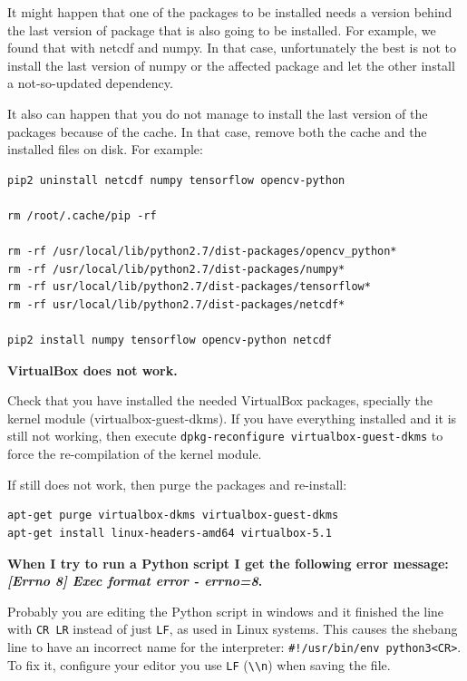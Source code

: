 \documentclass[a4paper,12pt]{article}
\begin{document}
It might happen that one of the packages to be installed needs a version behind the last version of package that is also going to be installed. For example, we found that with netcdf and numpy. In that case, unfortunately the best is not to install the last version of numpy or the affected package and let the other install a not-so-updated dependency.

It also can happen that you do not manage to install the last version of the packages because of the cache. In that case, remove both the cache and the installed files on disk. For example:

\begin{verbatim}
pip2 uninstall netcdf numpy tensorflow opencv-python

rm /root/.cache/pip -rf

rm -rf /usr/local/lib/python2.7/dist-packages/opencv_python*
rm -rf /usr/local/lib/python2.7/dist-packages/numpy*
rm -rf usr/local/lib/python2.7/dist-packages/tensorflow*
rm -rf usr/local/lib/python2.7/dist-packages/netcdf*

pip2 install numpy tensorflow opencv-python netcdf
\end{verbatim}
\vspace{0.5cm}

\textbf{VirtualBox does not work.}

Check that you have installed the needed VirtualBox packages, specially the kernel module (virtualbox-guest-dkms).
If you have everything installed and it is still not working, then execute {\tt dpkg-reconfigure virtualbox-guest-dkms} to force the re-compilation of the kernel module.

If still does not work, then purge the packages and re-install:

\begin{verbatim}
apt-get purge virtualbox-dkms virtualbox-guest-dkms
apt-get install linux-headers-amd64 virtualbox-5.1
\end{verbatim}
\vspace{0.5cm}

\textbf{When I try to run a Python script I get the following error message: \emph{[Errno 8] Exec format error - errno=8}.}

Probably you are editing the Python script in windows and it finished the line with {\tt CR LR} instead of just {\tt LF}, as used in Linux systems. This causes the shebang line to have an incorrect name for the interpreter: {\tt \#!/usr/bin/env python3<CR>}. To fix it, configure your editor you use {\tt LF} ({\tt \textbackslash \textbackslash n}) when saving the file.
\vspace{0.5cm}
\end{document}
